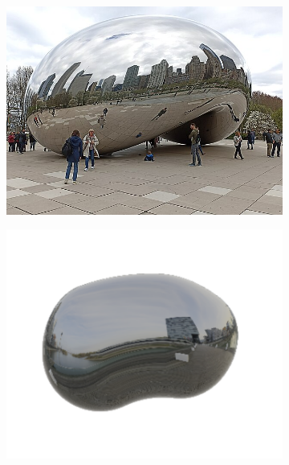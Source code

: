 \documentclass[%
reprint,
twocolumn,
nofootinbib,
 amsmath,amssymb,
 aps,
]{revtex4-2}
\begin{document}
\begin{figure}[h]
    \begin{subfigure}{0.23\textwidth}
        \includegraphics[width=0.98\linewidth]{img/Cloud_Gate_1.jpg}
    \end{subfigure}
    \begin{subfigure}{0.23\textwidth}
        \includegraphics[width=0.98\linewidth]{img/bean-bean.png}
    \end{subfigure}
    \begin{subfigure}{0.23\textwidth}

\end{subfigure}
\end{figure}
\end{document}

